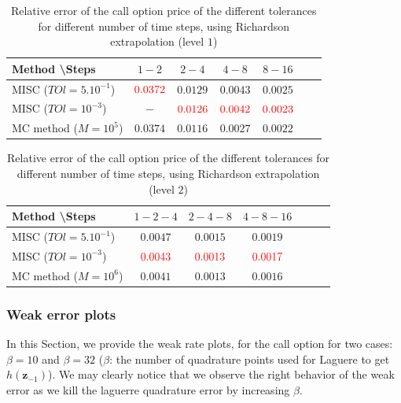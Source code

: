 \documentclass[11pt]{article}
\begin{document}
\begin{table}[h!]
	\centering
	\begin{tabular}{l*{5}{c}r}
		Method \textbackslash  Steps    &$1-2$        & $2-4$ & $4-8$ & $8-16$  \\
		\hline
		MISC ($TOl=5.10^{-1}$)  &${\color{red}0.0372}$ & $ 0.0129$ & $0.0043$ & $ 0.0025$  \\
		MISC ($TOl=10^{-3}$) & $-$ & $ {\color{red}0.0126}$ & ${\color{red}    0.0042}$ & ${\color{red}0.0023}$   \\
		MC method ($M=10^{5}$)&$ \mathbf{0.0374}$    & $\mathbf{0.0116}$  & $\mathbf{0.0027}$  & $\mathbf{0.0022}$ \\
		\hline
	\end{tabular}
	\caption{Relative error of the call option price of the different tolerances for different number of time steps, using Richardson extrapolation (level $1$)}
	\label{Relative error of Call option price of the different tolerances for different number of time steps, using Richardson extrapolation (level $1$)}
\end{table}


\begin{table}[h!]
	\centering
	\begin{tabular}{l*{5}{c}r}
		Method \textbackslash  Steps    &$1-2-4$        & $2-4-8$ & $4-8-16$   \\
		\hline
		MISC ($TOl=5.10^{-1}$)  &$0.0047$ & $  0.0015$ & $0.0019
		$   \\
		MISC ($TOl=10^{-3}$) & $ {\color{red}0.0043}$ & $ {\color{red}0.0013}$ & ${\color{red}  0.0017}$    \\
		MC method ($M=10^{6}$)&$ \mathbf{0.0041}$    & $\mathbf{0.0013}$  & $\mathbf{0.0016}$  \\
		\hline
	\end{tabular}
	\caption{Relative error of the call option price of the different tolerances for different number of time steps, using Richardson extrapolation (level $2$)}
	\label{Relative error of Call option price of the different tolerances for different number of time steps, using Richardson extrapolation (level $2$)}
\end{table}
\newpage
\subsubsection{Weak error plots} \label{sec:Weak error plots_call}

In this Section, we provide the weak rate plots, for the call option for two cases: $\beta=10$ and $\beta=32$ ($\beta$: the number of quadrature points used for Laguere to get $h(\mathbf{z}_{-1})$). We may clearly notice that we observe the right behavior of the weak error as we kill the laguerre quadrature error by increasing $\beta$.
\end{document}
